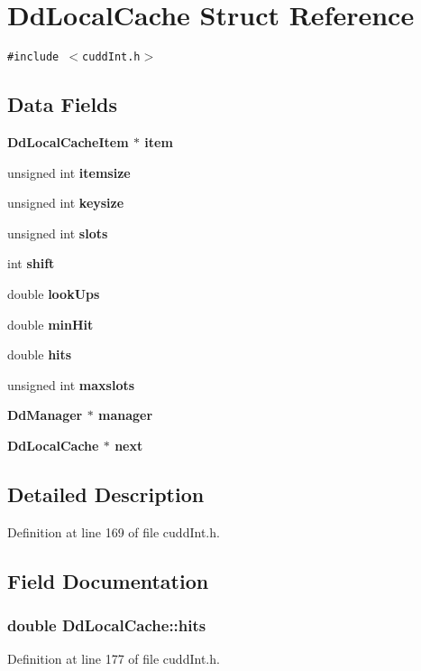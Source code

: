 \section{Dd\-Local\-Cache Struct Reference}
\label{structDdLocalCache}
{\tt \#include $<$cudd\-Int.h$>$}

\subsection*{Data Fields}
\begin{CompactItemize}
\item 
\bf{Dd\-Local\-Cache\-Item} $\ast$ \bf{item}
\item 
unsigned int \bf{itemsize}
\item 
unsigned int \bf{keysize}
\item 
unsigned int \bf{slots}
\item 
int \bf{shift}
\item 
double \bf{look\-Ups}
\item 
double \bf{min\-Hit}
\item 
double \bf{hits}
\item 
unsigned int \bf{maxslots}
\item 
\bf{Dd\-Manager} $\ast$ \bf{manager}
\item 
\bf{Dd\-Local\-Cache} $\ast$ \bf{next}
\end{CompactItemize}


\subsection{Detailed Description}




Definition at line 169 of file cudd\-Int.h.

\subsection{Field Documentation}
\subsubsection{\setlength{\rightskip}{0pt plus 5cm}double \bf{Dd\-Local\-Cache::hits}}\label{structDdLocalCache_eb0c91dbe5e63a318436df1d716810b6}




Definition at line 177 of file cudd\-Int.h.

